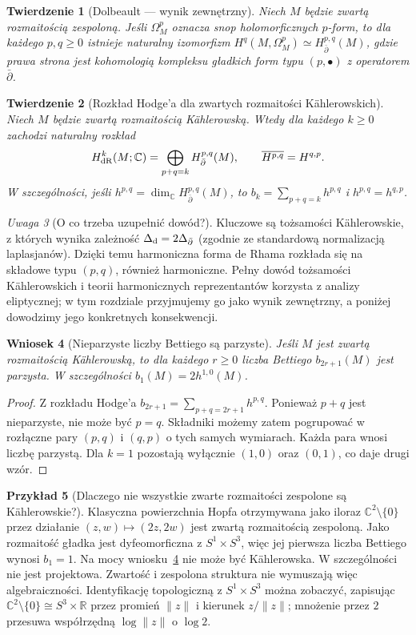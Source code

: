 \documentclass[11pt,a4paper,openany]{report}
\numberwithin{equation}{section}
\theoremstyle{plain}
\newtheorem{twierdzenie}{Twierdzenie}[section]
\newtheorem{wniosek}[twierdzenie]{Wniosek}
\theoremstyle{definition}
\newtheorem{przyklad}[twierdzenie]{Przykład}
\theoremstyle{remark}
\newtheorem{uwaga}[twierdzenie]{Uwaga}
\newcommand{\R}{\mathbb R}
\newcommand{\C}{\mathbb C}
\begin{document}
\begin{twierdzenie}[Dolbeault — wynik zewnętrzny]
Niech $M$ będzie zwartą rozmaitością zespoloną.
Jeśli $\Omega^p_M$ oznacza snop holomorficznych
$p$-form, to dla każdego $p,q\ge0$ istnieje
naturalny izomorfizm
$H^q(M,\Omega^p_M)\simeq H^{p,q}_{\bar\partial}(M)$,
gdzie prawa strona jest kohomologią kompleksu
gładkich form typu $(p,\bullet)$ z operatorem $\bar\partial$.
\end{twierdzenie}

\begin{twierdzenie}[Rozkład Hodge'a dla zwartych rozmaitości Kählerowskich]
\label{tw:ga9-hodge}
Niech $M$ będzie zwartą rozmaitością Kählerowską.
Wtedy dla każdego $k\ge0$ zachodzi naturalny rozkład
\[
 H^k_{\rm dR}(M;\C)
 =\bigoplus_{p+q=k}H^{p,q}_{\bar\partial}(M),
 \qquad \overline{H^{p,q}}=H^{q,p}.
\]
W szczególności, jeśli $h^{p,q}=\dim_\C H^{p,q}_{\bar\partial}(M)$,
to $b_k=\sum_{p+q=k}h^{p,q}$ i $h^{p,q}=h^{q,p}$.
\end{twierdzenie}

\begin{uwaga}[O co trzeba uzupełnić dowód?]
Kluczowe są tożsamości Kählerowskie, z których
wynika zależność $\Delta_{\rm d}=2\Delta_{\bar\partial}$
(zgodnie ze standardową normalizacją laplasjanów).
Dzięki temu harmoniczna forma de Rhama rozkłada się
na składowe typu $(p,q)$, również harmoniczne.
Pełny dowód tożsamości Kählerowskich i teorii
harmonicznych reprezentantów korzysta z analizy
eliptycznej; w tym rozdziale przyjmujemy go
jako wynik zewnętrzny, a poniżej dowodzimy jego
konkretnych konsekwencji.
\end{uwaga}

\begin{wniosek}[Nieparzyste liczby Bettiego są parzyste]
\label{wn:ga9-odd-betti}
Jeśli $M$ jest zwartą rozmaitością Kählerowską,
to dla każdego $r\ge0$ liczba Bettiego $b_{2r+1}(M)$
jest parzysta. W szczególności $b_1(M)=2h^{1,0}(M)$.
\end{wniosek}
\begin{proof}
Z rozkładu Hodge'a
$b_{2r+1}=\sum_{p+q=2r+1}h^{p,q}$.
Ponieważ $p+q$ jest nieparzyste, nie może być $p=q$.
Składniki możemy zatem pogrupować w rozłączne pary
$(p,q)$ i $(q,p)$ o tych samych wymiarach. Każda para
wnosi liczbę parzystą. Dla $k=1$ pozostają wyłącznie
$(1,0)$ oraz $(0,1)$, co daje drugi wzór.
\end{proof}

\begin{przyklad}[Dlaczego nie wszystkie zwarte rozmaitości zespolone są Kählerowskie?]
Klasyczna powierzchnia Hopfa otrzymywana jako iloraz
$\C^2\setminus\{0\}$ przez działanie
$(z,w)\mapsto(2z,2w)$ jest zwartą rozmaitością zespoloną.
Jako rozmaitość gładka jest dyfeomorficzna z
$S^1\times S^3$, więc jej pierwsza liczba Bettiego
wynosi $b_1=1$. Na mocy
wniosku~\ref{wn:ga9-odd-betti} nie może być Kählerowska.
W szczególności nie jest projektowa. Zwartość
i zespolona struktura nie wymuszają więc algebraiczności.
Identyfikację topologiczną z $S^1\times S^3$
można zobaczyć, zapisując $\C^2\setminus\{0\}
\cong S^3\times\R$ przez promień $\|z\|$ i kierunek
$z/\|z\|$; mnożenie przez $2$ przesuwa współrzędną
$\log\|z\|$ o $\log2$.
\end{przyklad}
\end{document}
